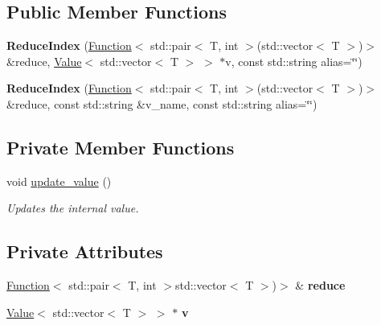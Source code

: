 \subsection*{Public Member Functions}
\begin{DoxyCompactItemize}
\item 
\hypertarget{classfv_1_1ReduceIndex_ad118a68262cfa9519bb7030502115ca9}{}\label{classfv_1_1ReduceIndex_ad118a68262cfa9519bb7030502115ca9} 
{\bfseries Reduce\+Index} (\hyperlink{classfv_1_1Function}{Function}$<$ std\+::pair$<$ T, int $>$(std\+::vector$<$ T $>$)$>$ \&reduce, \hyperlink{classfv_1_1Value}{Value}$<$ std\+::vector$<$ T $>$ $>$ $\ast$v, const std\+::string alias=\char`\"{}\char`\"{})
\item 
\hypertarget{classfv_1_1ReduceIndex_a0036e4d7f41cce518020a40666506a57}{}\label{classfv_1_1ReduceIndex_a0036e4d7f41cce518020a40666506a57} 
{\bfseries Reduce\+Index} (\hyperlink{classfv_1_1Function}{Function}$<$ std\+::pair$<$ T, int $>$(std\+::vector$<$ T $>$)$>$ \&reduce, const std\+::string \&v\+\_\+name, const std\+::string alias=\char`\"{}\char`\"{})
\end{DoxyCompactItemize}
\subsection*{Private Member Functions}
\begin{DoxyCompactItemize}
\item 
void \hyperlink{classfv_1_1ReduceIndex_a462bffebe2a93c940aca526566d48e37}{update\+\_\+value} ()
\begin{DoxyCompactList}\small\item\em Updates the internal value. \end{DoxyCompactList}\end{DoxyCompactItemize}
\subsection*{Private Attributes}
\begin{DoxyCompactItemize}
\item 
\hypertarget{classfv_1_1ReduceIndex_a36e2279f62f6480d882be0bc08cba098}{}\label{classfv_1_1ReduceIndex_a36e2279f62f6480d882be0bc08cba098} 
\hyperlink{classfv_1_1Function}{Function}$<$ std\+::pair$<$ T, int $>$std\+::vector$<$ T $>$)$>$ \& {\bfseries reduce}
\item 
\hypertarget{classfv_1_1ReduceIndex_a964863091c91f86b5718973f010dbb00}{}\label{classfv_1_1ReduceIndex_a964863091c91f86b5718973f010dbb00} 
\hyperlink{classfv_1_1Value}{Value}$<$ std\+::vector$<$ T $>$ $>$ $\ast$ {\bfseries v}
\end{DoxyCompactItemize}
